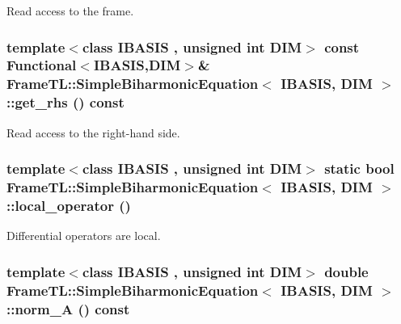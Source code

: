 Read access to the frame. \hypertarget{classFrameTL_1_1SimpleBiharmonicEquation_37ff3b226a0d77e00319bab67159632b}{
\subsubsection[{get\_\-rhs}]{\setlength{\rightskip}{0pt plus 5cm}template$<$class IBASIS , unsigned int DIM$>$ const {\bf Functional}$<$IBASIS,DIM$>$\& {\bf FrameTL::SimpleBiharmonicEquation}$<$ IBASIS, DIM $>$::get\_\-rhs () const}}
\label{classFrameTL_1_1SimpleBiharmonicEquation_37ff3b226a0d77e00319bab67159632b}


Read access to the right-hand side. \hypertarget{classFrameTL_1_1SimpleBiharmonicEquation_24c6d03c5657afb6a6758c55278a33d3}{
\subsubsection[{local\_\-operator}]{\setlength{\rightskip}{0pt plus 5cm}template$<$class IBASIS , unsigned int DIM$>$ static bool {\bf FrameTL::SimpleBiharmonicEquation}$<$ IBASIS, DIM $>$::local\_\-operator ()}}
\label{classFrameTL_1_1SimpleBiharmonicEquation_24c6d03c5657afb6a6758c55278a33d3}


Differential operators are local. \hypertarget{classFrameTL_1_1SimpleBiharmonicEquation_af3683e5652a266466d453da0f35f259}{
\subsubsection[{norm\_\-A}]{\setlength{\rightskip}{0pt plus 5cm}template$<$class IBASIS , unsigned int DIM$>$ double {\bf FrameTL::SimpleBiharmonicEquation}$<$ IBASIS, DIM $>$::norm\_\-A () const}}
\label{classFrameTL_1_1SimpleBiharmonicEquation_af3683e5652a266466d453da0f35f259}


